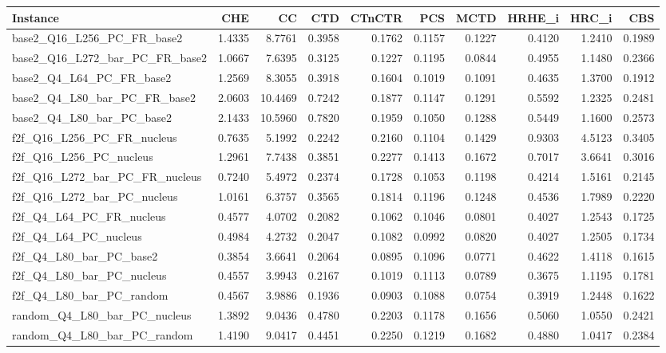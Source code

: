 \begin{tabular}{lrrrrrrrrr}
\toprule
Instance & CHE & CC & CTD & CTnCTR & PCS & MCTD & HRHE_i & HRC_i & CBS \\
\midrule
base2_Q16_L256_PC_FR_base2 & 1.4335 & 8.7761 & 0.3958 & 0.1762 & 0.1157 & 0.1227 & 0.4120 & 1.2410 & 0.1989 \\
base2_Q16_L272_bar_PC_FR_base2 & 1.0667 & 7.6395 & 0.3125 & 0.1227 & 0.1195 & 0.0844 & 0.4955 & 1.1480 & 0.2366 \\
base2_Q4_L64_PC_FR_base2 & 1.2569 & 8.3055 & 0.3918 & 0.1604 & 0.1019 & 0.1091 & 0.4635 & 1.3700 & 0.1912 \\
base2_Q4_L80_bar_PC_FR_base2 & 2.0603 & 10.4469 & 0.7242 & 0.1877 & 0.1147 & 0.1291 & 0.5592 & 1.2325 & 0.2481 \\
base2_Q4_L80_bar_PC_base2 & 2.1433 & 10.5960 & 0.7820 & 0.1959 & 0.1050 & 0.1288 & 0.5449 & 1.1600 & 0.2573 \\
f2f_Q16_L256_PC_FR_nucleus & 0.7635 & 5.1992 & 0.2242 & 0.2160 & 0.1104 & 0.1429 & 0.9303 & 4.5123 & 0.3405 \\
f2f_Q16_L256_PC_nucleus & 1.2961 & 7.7438 & 0.3851 & 0.2277 & 0.1413 & 0.1672 & 0.7017 & 3.6641 & 0.3016 \\
f2f_Q16_L272_bar_PC_FR_nucleus & 0.7240 & 5.4972 & 0.2374 & 0.1728 & 0.1053 & 0.1198 & 0.4214 & 1.5161 & 0.2145 \\
f2f_Q16_L272_bar_PC_nucleus & 1.0161 & 6.3757 & 0.3565 & 0.1814 & 0.1196 & 0.1248 & 0.4536 & 1.7989 & 0.2220 \\
f2f_Q4_L64_PC_FR_nucleus & 0.4577 & 4.0702 & 0.2082 & 0.1062 & 0.1046 & 0.0801 & 0.4027 & 1.2543 & 0.1725 \\
f2f_Q4_L64_PC_nucleus & 0.4984 & 4.2732 & 0.2047 & 0.1082 & 0.0992 & 0.0820 & 0.4027 & 1.2505 & 0.1734 \\
f2f_Q4_L80_bar_PC_base2 & 0.3854 & 3.6641 & 0.2064 & 0.0895 & 0.1096 & 0.0771 & 0.4622 & 1.4118 & 0.1615 \\
f2f_Q4_L80_bar_PC_nucleus & 0.4557 & 3.9943 & 0.2167 & 0.1019 & 0.1113 & 0.0789 & 0.3675 & 1.1195 & 0.1781 \\
f2f_Q4_L80_bar_PC_random & 0.4567 & 3.9886 & 0.1936 & 0.0903 & 0.1088 & 0.0754 & 0.3919 & 1.2448 & 0.1622 \\
random_Q4_L80_bar_PC_nucleus & 1.3892 & 9.0436 & 0.4780 & 0.2203 & 0.1178 & 0.1656 & 0.5060 & 1.0550 & 0.2421 \\
random_Q4_L80_bar_PC_random & 1.4190 & 9.0417 & 0.4451 & 0.2250 & 0.1219 & 0.1682 & 0.4880 & 1.0417 & 0.2384 \\
\bottomrule
\end{tabular}
